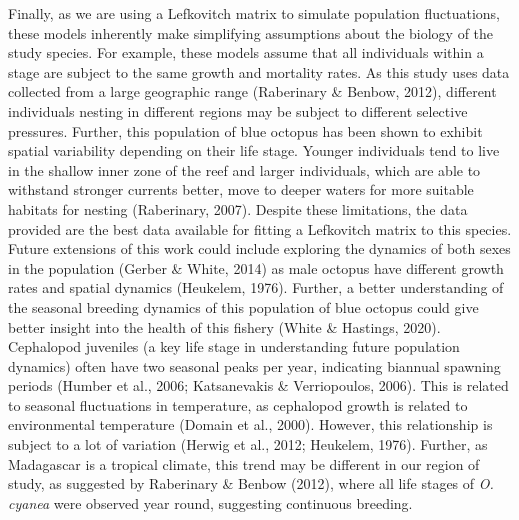\documentclass[
]{article}
\begin{document}
Finally, as we are using a Lefkovitch matrix to simulate population fluctuations, these models inherently make simplifying assumptions about the biology of the study species. For example, these models assume that all individuals within a stage are subject to the same growth and mortality rates. As this study uses data collected from a large geographic range (Raberinary \& Benbow, 2012), different individuals nesting in different regions may be subject to different selective pressures. Further, this population of blue octopus has been shown to exhibit spatial variability depending on their life stage. Younger individuals tend to live in the shallow inner zone of the reef and larger individuals, which are able to withstand stronger currents better, move to deeper waters for more suitable habitats for nesting (Raberinary, 2007). Despite these limitations, the data provided are the best data available for fitting a Lefkovitch matrix to this species. Future extensions of this work could include exploring the dynamics of both sexes in the population (Gerber \& White, 2014) as male octopus have different growth rates and spatial dynamics (Heukelem, 1976). Further, a better understanding of the seasonal breeding dynamics of this population of blue octopus could give better insight into the health of this fishery (White \& Hastings, 2020). Cephalopod juveniles (a key life stage in understanding future population dynamics) often have two seasonal peaks per year, indicating biannual spawning periods (Humber et al., 2006; Katsanevakis \& Verriopoulos, 2006). This is related to seasonal fluctuations in temperature, as cephalopod growth is related to environmental temperature (Domain et al., 2000). However, this relationship is subject to a lot of variation (Herwig et al., 2012; Heukelem, 1976). Further, as Madagascar is a tropical climate, this trend may be different in our region of study, as suggested by Raberinary \& Benbow (2012), where all life stages of \emph{O. cyanea} were observed year round, suggesting continuous breeding.
\end{document}
